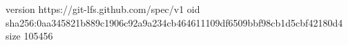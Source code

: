 version https://git-lfs.github.com/spec/v1
oid sha256:0aa345821b889c1906c92a9a234cb464611109df6509bbf98cb1d5cbf42180d4
size 105456
